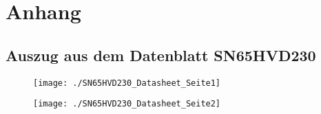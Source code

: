 \chapter{Anhang} \label{app:anhang}

\section{Auszug aus dem Datenblatt SN65HVD230} \label{app:anhang_1}
\begin{figure}[!ht]
	\centering
	\texttt{[image: ./SN65HVD230\_Datasheet\_Seite1]}
	\label{abb:SN65HVD230_Datasheet1}
\end{figure}

\begin{figure}[!hp]
	\centering
	\texttt{[image: ./SN65HVD230\_Datasheet\_Seite2]}
	\label{abb:SN65HVD230_Datasheet2}
\end{figure}
\newpage



